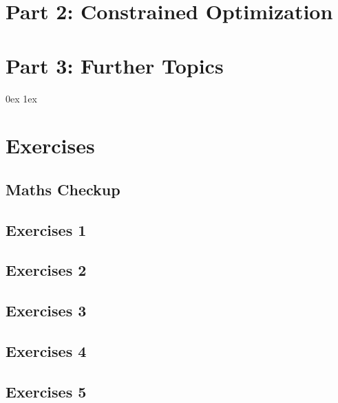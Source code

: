 \clearpage
\section{Part 2: Constrained Optimization}








\clearpage
\section{Part 3: Further Topics}






%
%



\clearpage
\fancyhfoffset{0mm}
\parindent 0ex
\parskip 1ex

\section{Exercises}

\subsection*{Maths Checkup}

\subsection{Exercises 1}

\subsection{Exercises 2}

\subsection{Exercises 3}

\subsection{Exercises 4}

\subsection{Exercises 5}

